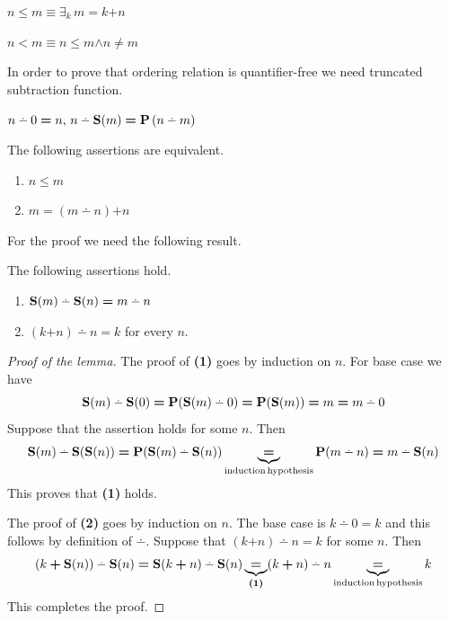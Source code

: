 \documentclass[10pt]{amsart}
\newcommand{\mexists}{\boldsymbol{\exists}}
\newcommand{\mand}{\boldsymbol{\wedge}}
\newcommand{\mle}{\boldsymbol{<}}
\newcommand{\mleq}{\boldsymbol{\leq}}
\newcommand{\meq}{\boldsymbol{=}}
\newcommand{\mneq}{\boldsymbol{\neq}}
\newcommand{\mplus}{\boldsymbol{+}}
\begin{document}
\begin{definition}
	$n \mleq m \equiv \mexists_k\,m \meq k \mplus n$
\end{definition}

\begin{definition}
	$n \mle m \equiv n\mleq m \mand n \mneq m$
\end{definition}
\noindent
In order to prove that ordering relation is quantifier-free we need truncated subtraction function.

\begin{definition}
	$n\dotminus 0 \meq n,\,n\dotminus \bd{S}(m) \meq \bd{P}\left(n\dotminus m\right)$
\end{definition}

\begin{proposition}\label{proposition:truncated_subtraction_and_difference}
	The following assertions are equivalent.
	\begin{enumerate}[label=\emph{\textbf{(\roman*)}}, leftmargin=3.0em]
		\item $n \mleq m$
		\item $m \meq (m \dotminus n) \mplus n$
	\end{enumerate}
\end{proposition}
\noindent
For the proof we need the following result.

\begin{lemma}\label{lemma:basic_properties_of_truncated_subtraction}
	The following assertions hold.
	\begin{enumerate}[label=\emph{\textbf{(\arabic*)}}, leftmargin=3.0em]
		\item $\bd{S}(m)\dotminus \bd{S}(n) \meq m \dotminus n$
		\item $(k \mplus n) \dotminus n \meq k$ for every $n$.
	\end{enumerate}
\end{lemma}
\begin{proof}[Proof of the lemma]
	The proof of \textbf{(1)} goes by induction on $n$. For base case we have
	$$\bd{S}(m) \dotminus \bd{S}(0) \meq \bd{P}(\bd{S}(m)\dotminus 0) \meq \bd{P}(\bd{S}(m)) \meq m \meq m\dotminus 0$$
	Suppose that the assertion holds for some $n$. Then
	$$\bd{S}(m)\dotminus \bd{S}(\bd{S}(n)) \meq \bd{P}(\bd{S}(m) \dotminus \bd{S}(n)) \underbrace{\meq}_{\mathrm{induction\,hypothesis}}\bd{P}(m\dotminus n) \meq m \dotminus \bd{S}(n)$$
	This proves that \textbf{(1)} holds.

	The proof of \textbf{(2)} goes by induction on $n$. The base case is $k\dotminus 0 \meq k$ and this follows by definition of $\dotminus$. Suppose that $(k \mplus n)\dotminus n \meq k$ for some $n$. Then
	$$\left(k \mplus \bd{S}(n)\right) \dotminus \bd{S}(n) \meq \bd{S}(k \mplus n) \dotminus \bd{S}(n) \underbrace{\meq}_{\textbf{(1)}}(k \mplus n) \dotminus n \underbrace{\meq}_{\mathrm{induction\,hypothesis}} k$$
	This completes the proof.
\end{proof}
\end{document}
